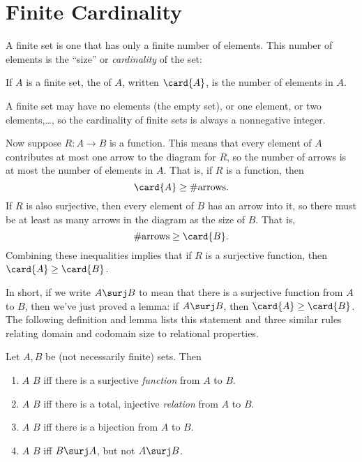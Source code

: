 \section{Finite Cardinality}\label{mappingrule_sec}

A finite set is one that has only a finite number of elements.  This
number of elements is the ``size'' or \emph{cardinality} of the set:
\begin{definition}\label{fin_card_def}
If $A$ is a finite set, the  of $A$, written
$\card{A}$, is the number of elements in $A$.
\end{definition}
A finite set may have no elements (the empty set), or one element, or
two elements,\dots, so the cardinality of finite sets is always a
nonnegative integer.

Now suppose $R:A \to B$ is a function.  This means that every element
of $A$ contributes at most one arrow to the diagram for $R$, so the
number of arrows is at most the number of elements in $A$.  That is,
if $R$ is a function, then
\[
\card{A} \geq \#\text{arrows}.
\]
If $R$ is also surjective, then every element of $B$ has an arrow into
it, so there must be at least as many arrows in the diagram as the
size of $B$.  That is,
\[
\#\text{arrows} \geq \card{B}.
\]
Combining these inequalities implies that if $R$ is a surjective
function, then $\card{A} \geq \card{B}$.

In short, if we write $A \surj B$ to mean that there is a surjective
function from $A$ to $B$, then we've just proved a lemma: if $A \surj
B$, then $\card{A} \geq \card{B}$.  The following definition and lemma
lists this statement and three similar rules relating domain and
codomain size to relational properties.

\begin{definition}\label{bigger}
  Let $A,B$ be (not necessarily finite) sets.  Then
  \begin{enumerate}
  \item $A$ \term{$\surj$} $B$ iff there is a surjective
    \emph{function} from $A$ to $B$.

  \item $A$ \term{$\inj$} $B$ iff there is a total, injective
    \emph{relation} from $A$ to $B$.

  \item $A$ \term{$\bij$} $B$ iff there is a bijection from $A$ to
    $B$.

  \item $A$ \term{$\strict$} $B$ iff $B \surj A$, but not $A \surj B$.

  \end{enumerate}
\end{definition}

